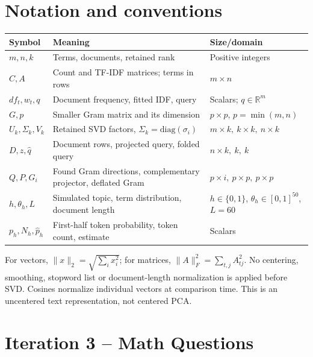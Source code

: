 \documentclass[11pt]{article}
\newcommand{\R}{\mathbb{R}}
\begin{document}
\section{Notation and conventions}
\begin{center}\small
\begin{tabular}{p{}p{}p{}}
\toprule Symbol & Meaning & Size/domain\\\midrule
$m,n,k$ & Terms, documents, retained rank & Positive integers\\
$C,A$ & Count and TF-IDF matrices; terms in rows & $m\times n$\\
$df_t,w_t,q$ & Document frequency, fitted IDF, query & Scalars; $q\in\R^m$\\
$G,p$ & Smaller Gram matrix and its dimension & $p\times p$, $p=\min(m,n)$\\
$U_k,\Sigma_k,V_k$ & Retained SVD factors, $\Sigma_k=\mathrm{diag}(\sigma_i)$ & $m\times k,\ k\times k,\ n\times k$\\
$D,z,\widehat q$ & Document rows, projected query, folded query & $n\times k,\ k,\ k$\\
$Q,P,G_i$ & Found Gram directions, complementary projector, deflated Gram & $p\times i,\ p\times p,\ p\times p$\\
$h,\theta_h,L$ & Simulated topic, term distribution, document length & $h\in\{0,1\}$, $\theta_h\in[0,1]^{50}$, $L=60$\\
$p_h,N_h,\widehat p_h$ & First-half token probability, token count, estimate & Scalars\\
\bottomrule
\end{tabular}\end{center}
For vectors, $\|x\|_2=\sqrt{\sum_i x_i^2}$; for matrices,
$\|A\|_F^2=\sum_{t,j}A_{tj}^2$. No centering, smoothing, stopword list or
document-length normalization is applied before SVD. Cosines normalize
individual vectors at comparison time. This is an uncentered text
representation, not centered PCA.

\section{Iteration 3 -- Math Questions}
\end{document}

